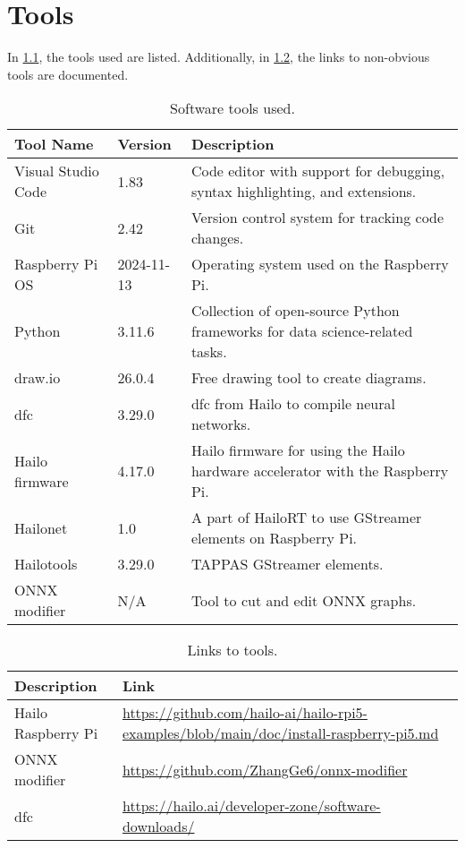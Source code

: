 \chapter{Tools}

In \cref{tab:softwaretools}, the tools used are listed. 
Additionally, in \cref{tab:softwaretoolslinks}, the links to non-obvious tools are documented.

\begin{table}[h!]
    \centering
    \begin{tabularx}{\textwidth}{|l|l|X|}
        \hline
        \textbf{Tool Name} & \textbf{Version} & \textbf{Description}   \\ \hline
        Visual Studio Code & 1.83 & Code editor with support for debugging, syntax highlighting, and extensions. \\ \hline
        Git & 2.42 & Version control system for tracking code changes. \\ \hline
        Raspberry Pi OS & 2024-11-13 & Operating system used on the Raspberry Pi. \\ \hline
        Python & 3.11.6 & Collection of open-source Python frameworks for data science-related tasks. \\ \hline
        draw.io & 26.0.4 & Free drawing tool to create diagrams. \\ \hline
        \acrlong{dfc} & 3.29.0 & \acrlong{dfc} from Hailo to compile neural networks. \\ \hline
        Hailo firmware & 4.17.0 & Hailo firmware for using the Hailo hardware accelerator with the Raspberry Pi. \\ \hline
        Hailonet & 1.0 & A part of HailoRT to use GStreamer elements on Raspberry Pi. \\ \hline
        Hailotools & 3.29.0 & TAPPAS GStreamer elements. \\ \hline
        ONNX modifier & N/A & Tool to cut and edit ONNX graphs. \\ \hline
    \end{tabularx}
    \caption{Software tools used.}
    \label{tab:softwaretools}
\end{table}

\begin{table}[h!]
    \centering
    \begin{tabularx}{\textwidth}{|l|X|}
        \hline
        \textbf{Description} & \textbf{Link} \\ \hline
        Hailo Raspberry Pi & \url{https://github.com/hailo-ai/hailo-rpi5-examples/blob/main/doc/install-raspberry-pi5.md} \\ \hline
        ONNX modifier & \url{https://github.com/ZhangGe6/onnx-modifier} \\ \hline
        \acrlong{dfc} & \url{https://hailo.ai/developer-zone/software-downloads/} \\ \hline
    \end{tabularx}
    \caption{Links to tools.}
    \label{tab:softwaretoolslinks}
\end{table}

